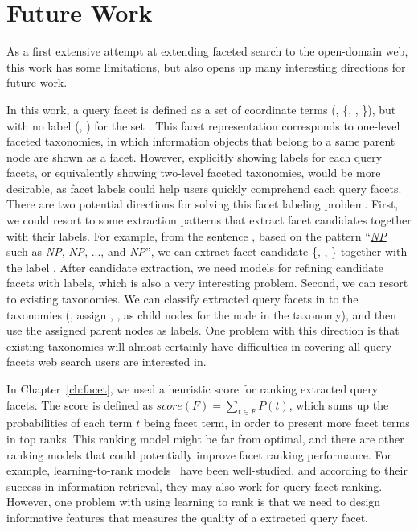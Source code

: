 \section{Future Work}
As a first extensive attempt at extending faceted search to the open-domain web, this work has some limitations, but also opens up many interesting directions for future work.


In this work, a query facet is defined as a set of coordinate terms (\eg, \{, , \}), but with no label (\eg, ) for the set . This facet representation corresponds to one-level faceted taxonomies, in which information objects that belong to a same parent node are shown as a facet. However, explicitly showing labels for each query facets, or equivalently showing two-level faceted taxonomies, would be more desirable, as facet labels could help users quickly comprehend each query facets. There are two potential directions for solving this facet labeling problem. First, we could resort to some extraction patterns that extract facet candidates together with their labels.
For example, from the sentence , based on the pattern ``\textit{\underline{NP}} such as \textit{NP}, \textit{NP}, ..., and \textit{NP}'', we can extract facet candidate \{, , \} together with the label . After candidate extraction, we need models for refining candidate facets with labels, which is also a very interesting problem. Second, we can resort to existing taxonomies. We can classify extracted query facets in to the taxonomies (\eg, assign , ,  as child nodes for the node  in the taxonomy), and then use the assigned parent nodes as labels. One problem with this direction is that existing taxonomies will almost certainly have difficulties in covering all query facets web search users are interested in. 

In Chapter~\ref{ch:facet}, we used a heuristic score for ranking extracted query facets. The score is defined as $score(F)=\sum_{t \in F}{P(t)}$, which sums up the probabilities of each term $t$ being facet term, in order to present more facet terms in top ranks. This ranking model might be far from optimal, and there are other ranking models that could potentially improve facet ranking performance. For example, learning-to-rank models~\cite{liu2009learning} have been well-studied, and according to their success in information retrieval, they may also work for query facet ranking. However, one problem with using learning to rank is that we need to design informative features that measures the quality of a extracted query facet.

